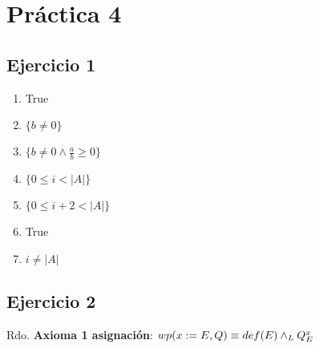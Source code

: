
\usepackage{caratula}
\usepackage{enumerate}
\usepackage{hyperref}
\usepackage{graphicx}
\usepackage{amsfonts}
\usepackage{enumitem}
\usepackage{listings} %

\decimalpoint
\hypersetup{colorlinks=true, linkcolor=black, urlcolor=blue}
\setlength{\parindent}{0em}
\setlength{\parskip}{0.5em}
\setcounter{tocdepth}{2} %
\setcounter{section}{3} %
\renewcommand{\thesubsubsection}{\thesubsection.\Alph{subsubsection}}
\graphicspath{ {images/} }





\maketitle
\newpage

\tableofcontents
\newpage


\section{Práctica 4}

\subsection{Ejercicio 1}
\begin{enumerate}
    \item True
    \item $ \{ b \neq 0 \} $
    \item $ \{ b \neq 0  \wedge \frac{a}{b} \geq 0 \} $
    \item $ \{ 0 \leq i < |A| \} $
    \item $ \{ 0 \leq i + 2 < |A| \} $
    \item True
    \item $ i \neq |A| $
\end{enumerate}

\subsection{Ejercicio 2}

Rdo. \textbf{Axioma 1 asignación}: $ wp(x:= E, Q) \equiv def(E) \land _L Q^x_E$

